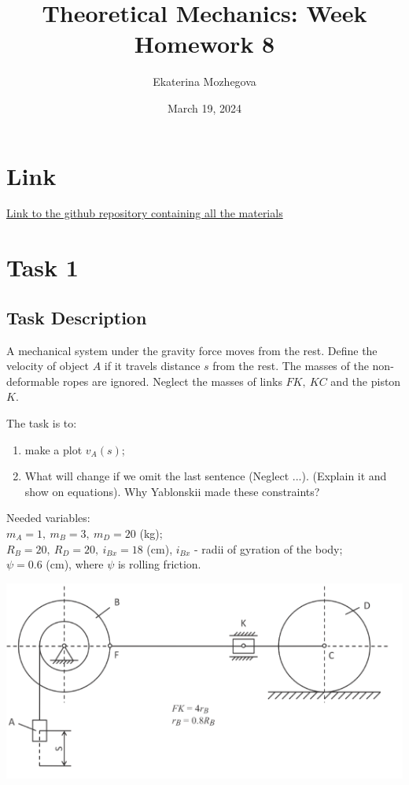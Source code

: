 \documentclass{article}
\title{Theoretical Mechanics: Week Homework 8}
\author{Ekaterina Mozhegova}
\date{March 19, 2024}
\begin{document}
\maketitle

\section{Link}
\href{https://github.com/illusoryTwin/Theoretical_mechanics/tree/master/hw7}{Link to the github repository containing all the materials}

\section{Task 1}

\subsection{Task Description}

A mechanical system under the gravity force moves from the rest. Define the velocity of object $A$ if it travels distance $s$ from the rest. The masses of the non-deformable ropes are ignored. Neglect the masses of links $FK,\ KC$ and the piston $K$.

The task is to:
\begin{enumerate}
    \item make a plot $v_A(s)$;
    \item What will change if we omit the last sentence (Neglect ...). (Explain it and show on equations). Why Yablonskii made these constraints?
\end{enumerate}

Needed variables:\\
$m_A=1,\ m_B=3,\ m_D=20$ (kg);\\
$R_B=20,\ R_D=20,\ i_{Bx}= 18$ (cm), $i_{Bx}$ - radii of gyration of the body;\\
$\psi = 0.6$ (cm), where $\psi$ is rolling friction.
   
\includegraphics[scale=0.5]{hw8_task1.png}
\end{document}
